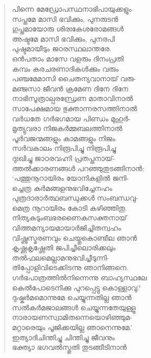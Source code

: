 \begin{verse}
പിന്നെ മേഡ്രോപസ്ഥനാഭിപായുക്കളും\\
സപ്തമേ മാസി ഭവിക്കും, പുനരുടന്‍\\
ഗുപ്തമായോരു ശിരഃകേശരോമങ്ങള്‍\\
അഷ്ടമേ മാസി ഭവിക്കും, പുനരപി\\
പുഷ്ടമായീടും ജഠരസ്ഥലാന്തരേ.\\
ഒന്‍പതാം മാസേ വളരും ദിനംപ്രതി\\
കമ്പം കരചരണാദികള്‍ക്കും വരും\\
പഞ്ചമേമാസി ചൈതന്യവാനായ് വരു-\\
മഞ്ജസാ ജീവന്‍ ക്രമേണ ദിനേ ദിനേ\\
നാഭിസൂത്രാല്പരന്ധ്രേണ മാതാവിനാല്‍\\
സാപേക്ഷമായ ഭുക്താന്നരസത്തിനാല്‍\\
വര്‍ധതേ ഗര്‍ഭഗമായ പിണ്ഡം മുഹുര്‍-\\
മൃത്യുവരാ നിജകര്‍മ്മബലത്തിനാല്‍\\
പൂര്‍വജന്മങ്ങളും കാമങ്ങളും നിജം\\
സര്‍വകാലം നിരൂപിച്ചു നിരൂപിച്ചു\\
ദുഃഖിച്ചു ജാഠരവഹ്നി പ്രതപ്തനായ്-\\
ത്തല്‍ക്കാരണങ്ങള്‍ പറഞ്ഞുതുടങ്ങിനാന്‍:\\
‘പത്തുനൂറായിരം യോനികളില്‍ ജനി-\\
ച്ചെത്ര കര്‍മങ്ങളനുഭവിച്ചേനഹം\\
പുത്രദാരാര്‍ത്ഥബന്ധുക്കള്‍ സംബന്ധവു-\\
മെത്ര നൂറായിരം കോടി കഴിഞ്ഞിതു.\\
നിത്യകുടുംബഭരണൈകസക്തനായ്\\
വിത്തമന്യായമായാര്‍ജിച്ചിതന്വഹം\\
വിഷ്ണുസ്മരണവും ചെയ്തുകൊണ്ടീല ഞാന്‍\\
കൃഷ്ണകൃഷ്ണേതി ജപിച്ചീലൊരിക്കലും\\
തല്‍ഫലമെല്ലാമനുഭവിച്ചീടുന്നി-\\
തിപ്പോളിവിടെക്കിടന്നു ഞാനിങ്ങനെ.\\
ഗര്‍ഭപാത്രത്തില്‍നിന്നെന്നു ബാഹ്യസ്ഥലേ\\
കെല്‍പോടെനിക്കു പുറപ്പെട്ടു കൊള്ളാവു?\\
ദുഷ്കര്‍മമൊന്നുമേ ചെയ്യുന്നതില്ല ഞാന്‍\\
സല്‍കര്‍മജാലങ്ങള്‍ ചെയ്യുന്നതേയുള്ളൂ\\
നാരായണസ്വാമിതന്നെയൊഴിഞ്ഞുമ-\\
മറ്റാരെയും പൂജിക്കയില്ല ഞാനെന്നുമേ.’\\
ഇത്യാദിചിന്തിച്ചു ചിന്തിച്ചു ജീവനും\\
ഭക്ത്യാ ഭഗവല്‍സ്തുതി തുടങ്ങീടിനാന്‍\\

\end{verse}
